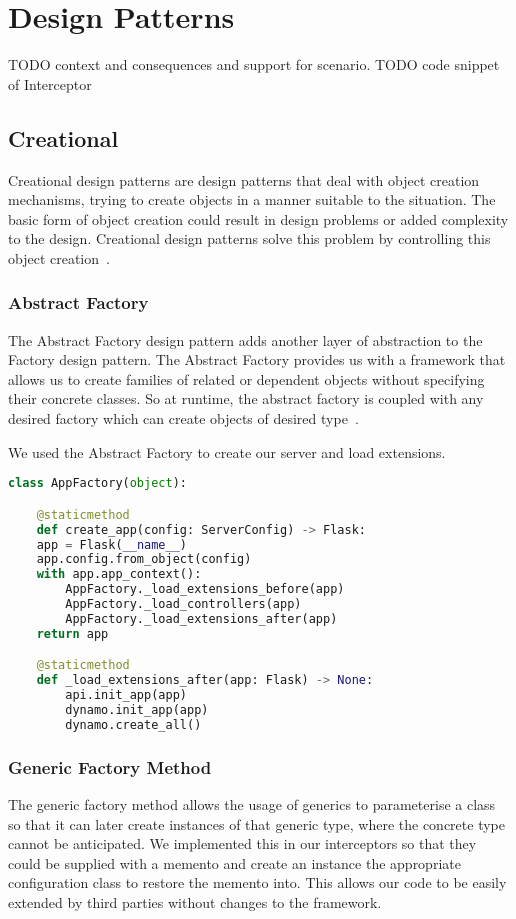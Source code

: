 \chapter{Design Patterns}
TODO context and consequences and support for scenario.
TODO code snippet of Interceptor

\section{Creational}
Creational design patterns are design patterns that deal with object creation
mechanisms, trying to create objects in a manner suitable to the situation. The basic form of object
creation could result in design problems or added complexity to the design. Creational design patterns
solve this problem by controlling this object creation~\citep{oodesign}.

\subsection{Abstract Factory}
The Abstract Factory design pattern adds another layer of abstraction to the Factory design pattern.
The Abstract Factory provides us with a framework that allows us to create families of related or
dependent objects without specifying their concrete classes. So at runtime, the abstract factory is
coupled with any desired factory which can create objects of desired type~\citep{oodesign}.

We used the Abstract Factory to create our server and load extensions.


\begin{lstlisting}[language=Python]
class AppFactory(object):

	@staticmethod
	def create_app(config: ServerConfig) -> Flask:
	app = Flask(__name__)
	app.config.from_object(config)
	with app.app_context():
		AppFactory._load_extensions_before(app)
		AppFactory._load_controllers(app)
		AppFactory._load_extensions_after(app)
	return app

	@staticmethod
	def _load_extensions_after(app: Flask) -> None:
		api.init_app(app)
		dynamo.init_app(app)
		dynamo.create_all()
\end{lstlisting}


\subsection{Generic Factory Method}
The generic factory method allows the usage of generics to parameterise a class so that it can later create instances
of that generic type, where the concrete type cannot be anticipated. We implemented this in our interceptors so
that they could be supplied with a memento and create an instance the appropriate configuration class to restore the
memento into. This allows our code to be easily extended by third parties without changes to the framework.


